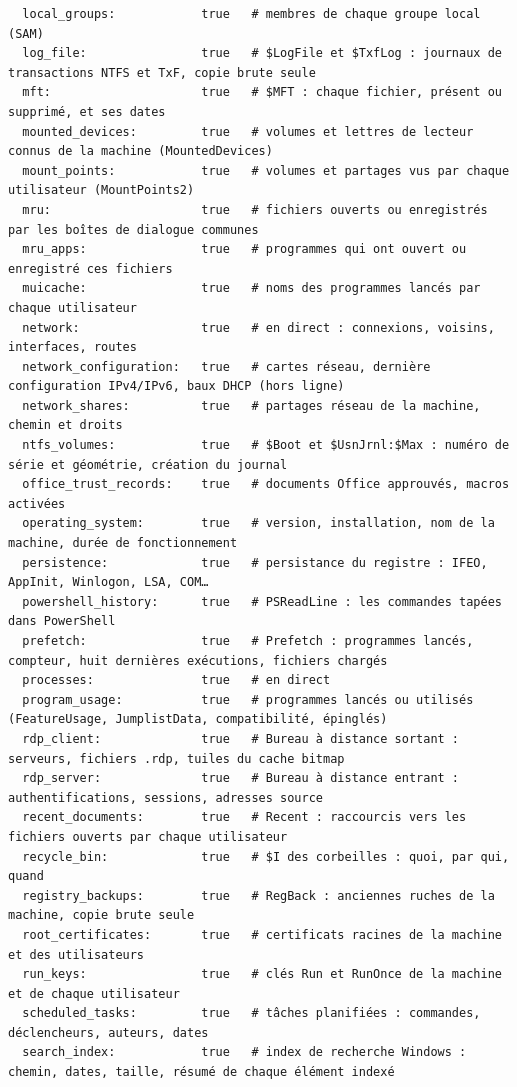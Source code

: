 \documentclass[11pt,a4paper,oneside]{report}
\begin{document}
\begin{lstlisting}
  local_groups:            true   # membres de chaque groupe local (SAM)
  log_file:                true   # $LogFile et $TxfLog : journaux de transactions NTFS et TxF, copie brute seule
  mft:                     true   # $MFT : chaque fichier, présent ou supprimé, et ses dates
  mounted_devices:         true   # volumes et lettres de lecteur connus de la machine (MountedDevices)
  mount_points:            true   # volumes et partages vus par chaque utilisateur (MountPoints2)
  mru:                     true   # fichiers ouverts ou enregistrés par les boîtes de dialogue communes
  mru_apps:                true   # programmes qui ont ouvert ou enregistré ces fichiers
  muicache:                true   # noms des programmes lancés par chaque utilisateur
  network:                 true   # en direct : connexions, voisins, interfaces, routes
  network_configuration:   true   # cartes réseau, dernière configuration IPv4/IPv6, baux DHCP (hors ligne)
  network_shares:          true   # partages réseau de la machine, chemin et droits
  ntfs_volumes:            true   # $Boot et $UsnJrnl:$Max : numéro de série et géométrie, création du journal
  office_trust_records:    true   # documents Office approuvés, macros activées
  operating_system:        true   # version, installation, nom de la machine, durée de fonctionnement
  persistence:             true   # persistance du registre : IFEO, AppInit, Winlogon, LSA, COM…
  powershell_history:      true   # PSReadLine : les commandes tapées dans PowerShell
  prefetch:                true   # Prefetch : programmes lancés, compteur, huit dernières exécutions, fichiers chargés
  processes:               true   # en direct
  program_usage:           true   # programmes lancés ou utilisés (FeatureUsage, JumplistData, compatibilité, épinglés)
  rdp_client:              true   # Bureau à distance sortant : serveurs, fichiers .rdp, tuiles du cache bitmap
  rdp_server:              true   # Bureau à distance entrant : authentifications, sessions, adresses source
  recent_documents:        true   # Recent : raccourcis vers les fichiers ouverts par chaque utilisateur
  recycle_bin:             true   # $I des corbeilles : quoi, par qui, quand
  registry_backups:        true   # RegBack : anciennes ruches de la machine, copie brute seule
  root_certificates:       true   # certificats racines de la machine et des utilisateurs
  run_keys:                true   # clés Run et RunOnce de la machine et de chaque utilisateur
  scheduled_tasks:         true   # tâches planifiées : commandes, déclencheurs, auteurs, dates
  search_index:            true   # index de recherche Windows : chemin, dates, taille, résumé de chaque élément indexé

\end{lstlisting}
\end{document}
